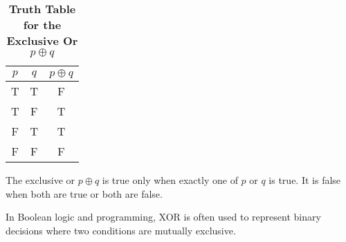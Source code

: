\begin{table}[h!]
\centering
\caption*{\textbf{Truth Table for the Exclusive Or $p \oplus q$}}
\begin{tabular}{|c|c!{\vrule width 1.5pt}c|}
\hline
{}
\textbf{$p$} & \textbf{$q$} & \textbf{$p \oplus q$} \\
\hline
T & T & F \\
T & F & T \\
F & T & T \\
F & F & F \\
\hline
\end{tabular}
\end{table}
\begin{tcolorbox}[colback=white, colframe=gray!60, title=Remark 1]
The exclusive or $p \oplus q$ is true only when exactly one of $p$ or $q$ is true. It is false when both are true or both are false.
\end{tcolorbox}
\begin{tcolorbox}[colback=white, colframe=gray!60, title=Remark 2]
In Boolean logic and programming, XOR is often used to represent binary decisions where two conditions are mutually exclusive.
\end{tcolorbox}



